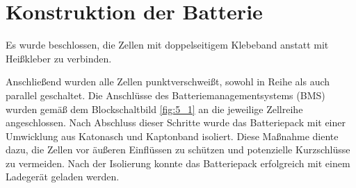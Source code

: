 





\section{Konstruktion der Batterie}

Es wurde beschlossen, die Zellen mit doppelseitigem Klebeband anstatt mit Heißkleber zu verbinden.


Anschließend wurden alle Zellen punktverschweißt, sowohl in Reihe als auch parallel geschaltet. Die Anschlüsse des Batteriemanagementsystems (BMS) wurden gemäß dem Blockschaltbild \ref{fig:5_1} an die jeweilige Zellreihe angeschlossen. Nach Abschluss dieser Schritte wurde das Batteriepack mit einer Umwicklung aus Katonasch und Kaptonband isoliert. Diese Maßnahme diente dazu, die Zellen vor äußeren Einflüssen zu schützen und potenzielle Kurzschlüsse zu vermeiden. Nach der Isolierung konnte das Batteriepack erfolgreich mit einem Ladegerät geladen werden.


